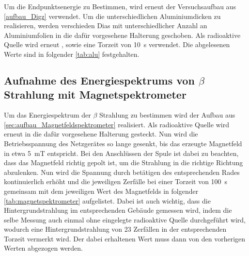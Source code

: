 \documentclass[12pt,english,ngerman]{scrartcl}
\begin{document}
Um die Endpunktsenergie zu Bestimmen, wird erneut der Versuchsaufbau aus
\autoref{aufbau_Digz} verwendet. Um die unterschiedlichen Aluminiumdicken zu
realisieren, werden verschieden Dias mit unterschiedlicher Anzahl an
Aluminiumfolien in die dafür vorgesehene Halterung geschoben. Als radioaktive
Quelle wird erneut , sowie eine Torzeit von \SI{10}{\second}
verwendet. Die abgelesenen Werte sind in folgender \autoref{tab:alu}
festgehalten.

%     


\subsection{Aufnahme des Energiespektrums von \texorpdfstring{$\beta$}{beta} Strahlung mit Magnetspektrometer}

Um das Energiespektrum der $\beta$ Strahlung zu bestimmen wird der Aufbau aus
\autoref{sec:aufbau_Magnetfeldspektrometer} realisiert. Als radioaktive Quelle
wird erneut  in die dafür vorgesehene Halterung gesteckt. Nun
wird die Betriebsspannung des Netzgerätes so lange gesenkt, bis das erzeugte
Magnetfeld in etwa \SI{5}{\milli\tesla} entspricht. Bei den Anschlüssen der
Spule ist dabei zu beachten, dass das Magnetfeld richtig gepolt ist, um die
Strahlung in die richtige Richtung abzulenken. Nun wird die Spannung durch
betätigen des entsprechenden Rades kontinuierlich erhöht und die jeweiligen
Zerfälle bei einer Torzeit von \SI{100}{\second} gemeinsam mit dem jeweiligen
Wert des Magnetfelds in folgender \autoref{tab:magnetspektrometer} aufgelistet.
Dabei ist auch wichtig, dass die Hintergrundstrahlung im entsprechenden Gebäude
gemessen wird, indem die selbe Messung auch einmal ohne eingelegte radioaktive
Quelle durchgeführt wird, wodurch eine Hintergrundstrahlung von 23 Zerfällen in der entsprechenden Torzeit vermerkt wird.
Der dabei erhaltenen Wert muss dann von den
vorherigen Werten abgezogen werden.

\begin{table}[H]
  \caption[Verzeichnete Zerfälle bei entsprechendem Magnetfeld]{Verzeichnete Zerfälle bei entsprechendem Magnetfeld
  bei einer Torzeit von \SI{100}{\second}. Die Unsicherheit beträgt dabei \SI{}{} \\
 $ B \dots$ Stärke des Magnetfelds in mT \\
 $ n \dots$ erhaltene  bei erhaltene Anzahl an Zerfällen bei entsprechendem Magnetfeld}
  \label{tab:magnetspektrometer}
  \begin{center}
    
  \end{center}
\end{table}
\end{document}
